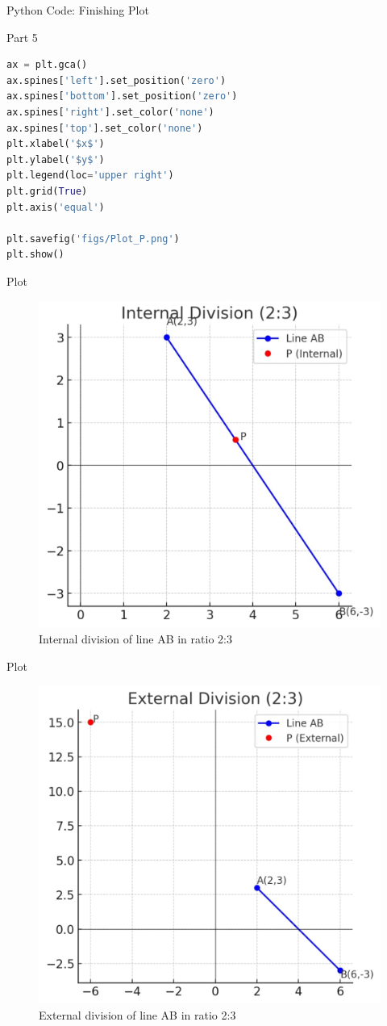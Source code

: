 \documentclass{beamer}
\begin{document}
\begin{frame}[fragile]{Python Code: Finishing Plot}
\begin{block}{Part 5}
\begin{lstlisting}[language=Python, basicstyle=\ttfamily\small, keywordstyle=\color{blue}, frame=single]
ax = plt.gca()
ax.spines['left'].set_position('zero')
ax.spines['bottom'].set_position('zero')
ax.spines['right'].set_color('none')
ax.spines['top'].set_color('none')
plt.xlabel('$x$')
plt.ylabel('$y$')
plt.legend(loc='upper right')
plt.grid(True)
plt.axis('equal')

plt.savefig('figs/Plot_P.png')
plt.show()
\end{lstlisting}
\end{block}
\end{frame}

\begin{frame}{Plot}
    \begin{figure}
        \centering
        \includegraphics[width=0.55\columnwidth]{figs/fig_int_div.jpeg}
        \caption{Internal division of line AB in ratio 2:3}
    \end{figure}
\end{frame}


\begin{frame}{Plot}
    \begin{figure}
        \centering
        \includegraphics[width=0.55\columnwidth]{figs/fig_ext_div.jpeg}
        \caption{External division of line AB in ratio 2:3}
    \end{figure}
\end{frame}
\end{document}
